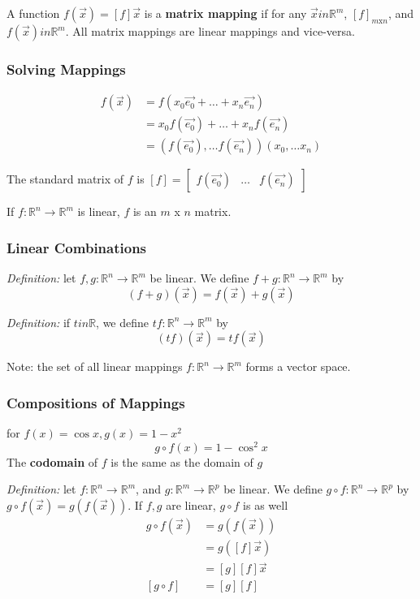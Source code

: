 \documentclass[12pt]{article}
\newcommand{\R}[1]{\mathbb{R}^{#1}}
\begin{document}
A function $f(\vec{x}) = [f]\vec{x}$ is a {\bf matrix mapping} if for any $\vec{x}in\R{m}$, $[f]_{m\text{x}n}$, and $f(\vec{x})in\R{m}$. All matrix mappings are linear mappings and vice-versa.

\subsubsection*{Solving Mappings}
\begin{align*}
f(\vec{x}) &= f(x_0\vec{e_0} + \dots + x_n\vec{e_n})\\
&= x_0f(\vec{e_0}) + \dots + x_nf(\vec{e_n})\\
&= (f(\vec{e_0}),\dots f(\vec{e_n}))(x_0,\dots x_n)
\end{align*}

The standard matrix of $f$ is $[f] = \begin{bmatrix}f(\vec{e_0})&\dots&f(\vec{e_n})\end{bmatrix}$

If $f: \R{n} \to \R{m}$ is linear, $f$ is an $m$ x $n$ matrix.

\subsubsection*{Linear Combinations}
\textit{Definition:} let $f, g: \R{n} \to \R{m}$ be linear. We define $f + g : \R{n} \to \R{m}$ by \[ (f + g)(\vec{x}) = f(\vec{x}) + g(\vec{x}) \]

\textit{Definition:} if $tin\mathbb{R}$, we define $tf: \R{n} \to \R{m}$ by \[ (tf)(\vec{x}) = tf(\vec{x}) \]

Note: the set of all linear mappings $f: \mathbb{R}^n \rightarrow \mathbb{R}^m$ forms a vector space.

\subsubsection*{Compositions of Mappings}
for $f(x) = \cos x, g(x) = 1 - x^2$ \[ g \circ f(x) = 1 - \cos^2 x \] The {\bf codomain} of $f$ is the same as the domain of $g$

\textit{Definition:} let $f : \R{n} \to \R{m}$, and $g : \R{m} \to \R{p}$ be linear. We define $g\circ f : \R{n} \to \R{p}$ by $g\circ f(\vec{x}) = g(f(\vec{x}))$. If $f,g$ are linear, $g\circ f$ is as well
\begin{align*}
g\circ f(\vec{x}) &= g(f(\vec{x}))\\
&= g([f]\vec{x})\\
&= [g][f]\vec{x}\\
[g\circ f] &= [g][f]
\end{align*}
\end{document}
